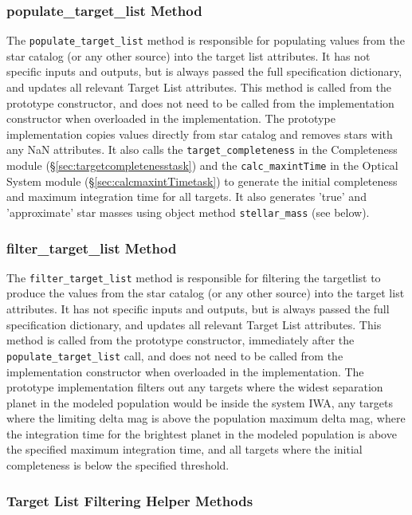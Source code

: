 \documentclass[cleanfoot]{asme2ej}
\begin{document}
\subsubsection{populate\_target\_list Method} \label{sec:populatetargetlisttask}

The \verb+populate_target_list+ method is responsible for populating values from the star catalog  (or any other source) into the target list attributes. It has not specific inputs and outputs, but is always passed the full specification dictionary, and updates all relevant Target List attributes.  This method is called from the prototype constructor, and does not need to be called from the implementation constructor when overloaded in the implementation.   The prototype implementation copies values directly from star catalog and removes stars with any NaN attributes. It also calls the \verb+target_completeness+ in the Completeness module (\S\ref{sec:targetcompletenesstask}) and the \verb+calc_maxintTime+ in the Optical System module (\S\ref{sec:calcmaxintTimetask}) to generate the initial completeness and maximum integration time for all targets.  It also generates 'true' and 'approximate' star masses using object method \verb+stellar_mass+ (see below).

\subsubsection{filter\_target\_list Method}  \label{sec:filtertargetlisttask}
The \verb+filter_target_list+ method is responsible for filtering the targetlist to produce the values from the star catalog  (or any other source) into the target list attributes. It has not specific inputs and outputs, but is always passed the full specification dictionary, and updates all relevant Target List attributes.  This method is called from the prototype constructor, immediately after the \verb+populate_target_list+ call, and does not need to be called from the implementation constructor when overloaded in the implementation.   The prototype implementation filters out any targets where the widest separation planet in the modeled population would be inside the system IWA, any targets where the limiting delta mag is above the population maximum delta mag, where the integration time for the brightest planet in the modeled population is above the specified maximum integration time, and all targets where the initial completeness is below the specified threshold. 

\subsubsection{Target List Filtering Helper Methods}
\end{document}
